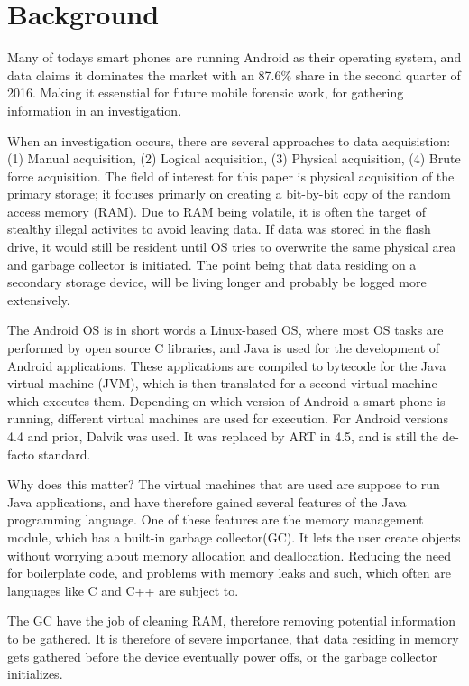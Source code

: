 \section{Background}
Many of todays smart phones are running Android as their operating system, and  data claims it dominates the market with an 87.6\% share in the second quarter of 2016\cite{idc}. Making it essenstial for future mobile forensic work, for gathering information in an investigation.

When an investigation occurs, there are several approaches to data acquisistion: (1) Manual acquisition, (2) Logical acquisition, (3) Physical acquisition, (4) Brute force acquisition. The field of interest for this paper is physical acquisition of the primary storage; it focuses primarly on creating a bit-by-bit copy of the random access memory (RAM). Due to RAM being volatile, it is often the target of stealthy illegal activites to avoid leaving data. If data was stored in the flash drive, it would still be resident until OS tries to overwrite the same physical area and garbage collector is initiated. The point being that data residing on a secondary storage device, will be living longer and probably be logged more extensively.

The Android OS is in short words a Linux-based OS, where most OS tasks are performed by open source C libraries, and Java is used for the development of Android applications. These applications are compiled to bytecode for the Java virtual machine (JVM), which is then translated for a second virtual machine which executes them. Depending on which version of Android a smart phone is running, different virtual machines are used for execution.
For Android versions 4.4 and prior, Dalvik was used. It was replaced by ART in 4.5, and is still the de-facto standard.

Why does this matter? The virtual machines that are used are suppose to run Java applications, and have therefore gained several features of the Java programming language. One of these features are the memory management module, which has a built-in garbage collector(GC). It lets the user create objects without worrying about memory allocation and deallocation. Reducing the need for boilerplate code, and problems with memory leaks and such, which often are languages like C and C++ are subject to. 

The GC have the job of cleaning RAM, therefore removing potential information to be gathered. It is therefore of severe importance, that data residing in memory gets gathered before the device eventually power offs, or the garbage collector initializes.

